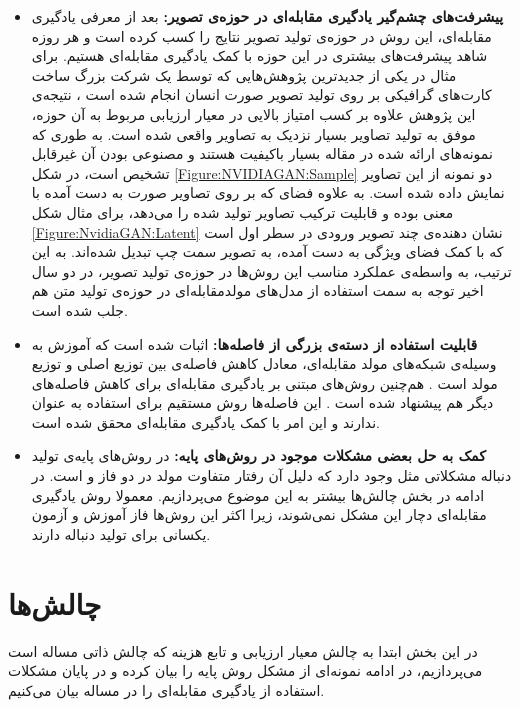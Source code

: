 \begin{itemize}
	\item 
	\textbf{پیشرفت‌های چشم‌گیر یادگیری مقابله‌ای در حوزه‌ی تصویر:}
	بعد از معرفی یادگیری مقابله‌ای، این روش در حوزه‌ی تولید تصویر نتایج
	را کسب کرده است و هر روزه شاهد پیشرفت‌های بیشتری در این حوزه با کمک یادگیری مقابله‌ای هستیم.
	\newline
	برای مثال در یکی از جدیدترین پژوهش‌هایی که توسط یک شرکت بزرگ ساخت کارت‌های گرافیکی بر روی تولید تصویر صورت انسان انجام شده است
	\cite{karras2018style}،
نتیجه‌ی این پژوهش علاوه بر کسب امتیاز بالایی در معیار ارزیابی مربوط به آن حوزه، موفق به تولید تصاویر بسیار نزدیک به تصاویر واقعی شده است.
به طوری که نمونه‌های ارائه شده در مقاله بسیار باکیفیت هستند و مصنوعی بودن آن غیرقابل تشخیص است، در شکل 
	\ref{Figure:NVIDIAGAN:Sample}
	دو نمونه از این تصاویر نمایش داده شده است. به علاوه فضای
	که بر روی تصاویر صورت به دست آمده با معنی بوده و قابلیت ترکیب تصاویر تولید شده را می‌دهد، برای مثال شکل
	\ref{Figure:NvidiaGAN:Latent}
	نشان دهنده‌ی چند تصویر ورودی در سطر اول است که با کمک فضای ویژگی به دست آمده، به
	تصویر سمت چپ تبدیل شده‌اند. به این ترتیب، به واسطه‌ی عملکرد مناسب این روش‌ها در حوزه‌ی تولید تصویر، در دو سال اخیر توجه به سمت استفاده از مدل‌های مولدمقابله‌ای در حوزه‌ی تولید متن هم جلب شده است.
	\item 
	\textbf{قابلیت استفاده از دسته‌ی بزرگی از فاصله‌ها: }
	اثبات شده است که آموزش به وسیله‌ی شبکه‌های مولد مقابله‌ای،
 معادل کاهش فاصله‌ی
بین توزیع اصلی و توزیع مولد است
\cite{Goodfellow2014}.
هم‌چنین روش‌های مبتنی بر یادگیری مقابله‌ای برای کاهش فاصله‌های دیگر هم پیشنهاد شده است
\cite{Nowozin2016, Poole2016}.
این فاصله‌ها روش مستقیم برای استفاده به عنوان
  ندارند و این امر با کمک یادگیری مقابله‌ای محقق شده است.
	\item 
	\textbf{کمک به حل بعضی مشکلات موجود در روش‌های پایه:}
	در روش‌های پایه‌ی تولید دنباله مشکلاتی مثل
	وجود دارد که دلیل آن رفتار متفاوت مولد در دو فاز 
	 و 
	 است. در ادامه در بخش چالش‌ها بیشتر به این موضوع می‌پردازیم.
 معمولا روش یادگیری مقابله‌ای دچار این مشکل نمی‌شوند، زیرا اکثر این روش‌ها فاز آموزش و آزمون یکسانی برای تولید دنباله دارند.
\end{itemize}

\section{چالش‌ها}\label{ch1:dooshvari}
در این بخش ابتدا به چالش معیار ارزیابی و تابع هزینه که چالش ذاتی مساله است می‌پردازیم، در ادامه نمونه‌ای از مشکل روش پایه را بیان کرده و در پایان مشکلات استفاده از یادگیری مقابله‌ای را در مساله بیان می‌کنیم.
